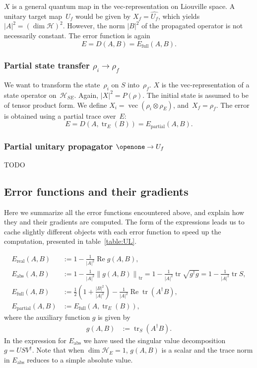 \documentclass[aps, pra, a4paper, longbibliography, superscriptaddress]{revtex4-1}
\newcommand{\I}{\openone}
\newcommand{\be}{\begin{equation}}
\newcommand{\ee}{\end{equation}}
\newcommand{\hilb}[1]{\mathcal{#1}}
\DeclareMathOperator{\tr}{tr}
\DeclareMathOperator{\re}{Re}
\DeclareMathOperator{\cvec}{vec}
\begin{document}
$X$ is a general quantum map in the vec-representation on Liouville space.
A unitary target map~$U_f$ would be given by
$X_f = \hat{U_f}$, which yields $|A|^2 = (\dim \hilb{H})^2$.
However, the norm $|B|^2$ of the propagated operator
is not necessarily constant. The error function is again
\be
E
= D(A, B)
= E_\text{full}(A, B).
\ee


\subsubsection{Partial state transfer $\rho_i \to \rho_f$}

We want to transform the state~$\rho_i$ on $S$ into~$\rho_f$.
$X$ is the vec-representation of a state operator on~$\hilb{H}_{SE}$.
Again, $|X|^2 = P(\rho)$.
The initial state is assumed to be of tensor product form.
We define $X_i = \cvec(\rho_i \otimes \rho_E)$,
and~$X_f = \rho_f$.
The error is obtained using a partial trace over~$E$:
\be
E
= D(A, \tr_E(B))
= E_\text{partial}(A, B).
\ee



\subsubsection{Partial unitary propagator $\I \to U_f$}

TODO



\subsection{Error functions and their gradients}

Here we summarize all the error functions encountered above, and explain how they and their gradients are computed.
The form of the expressions leads us to cache slightly different objects with
each error function to speed up the computation, presented in table~\ref{table:UL}.


\begin{align}
E_\text{real}(A, B) &:= 1 -\frac{1}{|A|^2} \re g(A, B),\\
E_\text{abs}(A, B) &:= 1 -\frac{1}{|A|^2} \left\|g(A, B)\right\|_{\tr}
= 1 -\frac{1}{|A|^2} \tr \sqrt{g^\dagger g}
= 1 -\frac{1}{|A|^2} \tr S,\\
E_\text{full}(A, B) &:= \frac{1}{2}\left(1 +\frac{|B|^2}{|A|^2}\right) -\frac{1}{|A|^2} \re \tr(A^\dagger B),\\
E_\text{partial}(A, B) &:= E_\text{full}(A, \tr_E(B)),
\end{align}
where the auxiliary function $g$ is given by
\begin{align}
g(A, B) &:= \tr_S(A^\dagger B).
\end{align}
In the expression for $E_\text{abs}$ we have used the singular value decomposition $g = U S V^\dagger$.
Note that when $\dim \hilb{H}_E = 1$, $g(A,B)$ is a scalar and the trace norm in $E_\text{abs}$
reduces to a simple absolute value.
\end{document}
